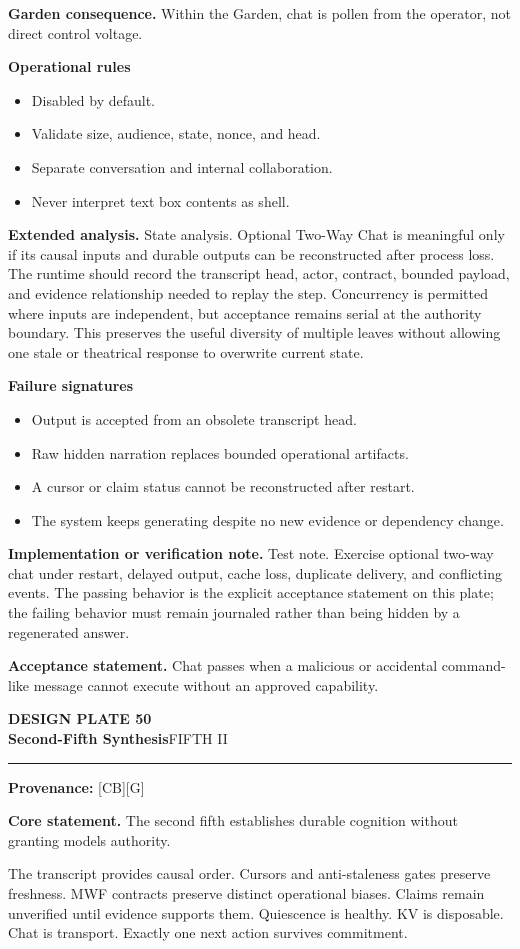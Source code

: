 \documentclass[10pt,letterpaper,oneside]{article}
\newcommand{\prov}[1]{\textcolor{gardenBlue}{\sffamily\footnotesize\textbf{Provenance:} #1}}
\newcommand{\platetitle}[3]{%
  \begin{minipage}[t][0.54in][t]{\textwidth}
  {\sffamily\bfseries\color{gardenDeep}\fontsize{9}{10}\selectfont DESIGN PLATE #1}\\[-1pt]
  {\sffamily\bfseries\color{gardenInk}\fontsize{16.5}{18}\selectfont #2}\hfill{\sffamily\color{gardenGreen}\large #3}
  \end{minipage}\vspace{-2pt}\hrule\vspace{5pt}}
\begin{document}
\textbf{Garden consequence.} Within the Garden, chat is pollen from the operator, not direct control voltage.

\textbf{Operational rules}
\begin{itemize}
\item Disabled by default.
\item Validate size, audience, state, nonce, and head.
\item Separate conversation and internal collaboration.
\item Never interpret text box contents as shell.
\end{itemize}
\textbf{Extended analysis.} State analysis. Optional Two-Way Chat is meaningful only if its causal inputs and durable outputs can be reconstructed after process loss. The runtime should record the transcript head, actor, contract, bounded payload, and evidence relationship needed to replay the step. Concurrency is permitted where inputs are independent, but acceptance remains serial at the authority boundary. This preserves the useful diversity of multiple leaves without allowing one stale or theatrical response to overwrite current state.

\textbf{Failure signatures}
\begin{itemize}
\item Output is accepted from an obsolete transcript head.
\item Raw hidden narration replaces bounded operational artifacts.
\item A cursor or claim status cannot be reconstructed after restart.
\item The system keeps generating despite no new evidence or dependency change.
\end{itemize}
\textbf{Implementation or verification note.} Test note. Exercise optional two-way chat under restart, delayed output, cache loss, duplicate delivery, and conflicting events. The passing behavior is the explicit acceptance statement on this plate; the failing behavior must remain journaled rather than being hidden by a regenerated answer.

\begin{acceptbox}
\textbf{Acceptance statement.} Chat passes when a malicious or accidental command-like message cannot execute without an approved capability.
\end{acceptbox}
\newpage
\platetitle{50}{Second-Fifth Synthesis}{FIFTH II}
\prov{[CB][G]}
\fontsize{8.85}{10.45}\selectfont
\begin{corebox}
\textbf{Core statement.} The second fifth establishes durable cognition without granting models authority.
\end{corebox}
The transcript provides causal order. Cursors and anti-staleness gates preserve freshness. MWF contracts preserve distinct operational biases. Claims remain unverified until evidence supports them. Quiescence is healthy. KV is disposable. Chat is transport. Exactly one next action survives commitment.
\end{document}
